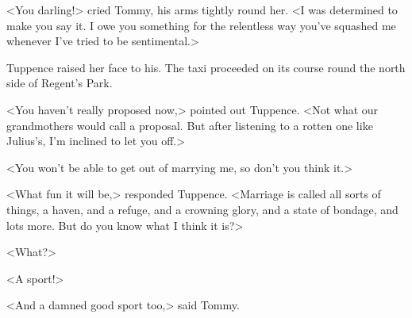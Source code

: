<You darling!> cried Tommy, his arms tightly round her. <I was determined to make you say it. I owe you something for the relentless way you've squashed me whenever I've tried to be sentimental.>

Tuppence raised her face to his. The taxi proceeded on its course round the north side of Regent's Park.

<You haven't really proposed now,> pointed out Tuppence. <Not what our grandmothers would call a proposal. But after listening to a rotten one like Julius's, I'm inclined to let you off.>

<You won't be able to get out of marrying me, so don't you think it.>

<What fun it will be,> responded Tuppence. <Marriage is called all sorts of things, a haven, and a refuge, and a crowning glory, and a state of bondage, and lots more. But do you know what I think it is?>

<What?>

<A sport!>

<And a damned good sport too,> said Tommy. 